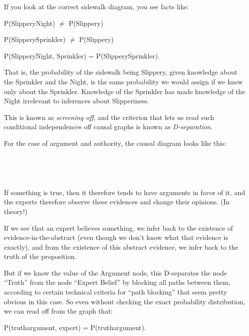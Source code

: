 {
 If you look at the correct sidewalk diagram, you see facts like:}

{\centering
 P(Slippery{\textbar}Night) ${\neq}$ P(Slippery)
\par}


\bigskip

{\centering
 P(Slippery{\textbar}Sprinkler) ${\neq}$ P(Slippery)
\par}


\bigskip

{\centering
 P(Slippery{\textbar}Night, Sprinkler) =
P(Slippery{\textbar}Sprinkler).
\par}


\bigskip

{
 That is, the probability of the sidewalk being Slippery, given
knowledge about the Sprinkler and the Night, is the same probability we
would assign if we knew only about the Sprinkler. Knowledge of the
Sprinkler has made knowledge of the Night irrelevant to inferences
about Slipperiness.}

{
 This is known as \textit{screening off}, and the criterion that
lets us read such conditional independences off causal graphs is known
as \textit{D-separation}.}

{
 For the case of argument and authority, the causal diagram looks
like this:}

{
 ~}



{
 ~}

{
 If something is true, then it therefore tends to have arguments in
favor of it, and the experts therefore observe these evidences and
change their opinions. (In theory!)}

{
 If we see that an expert believes something, we infer back to the
existence of evidence-in-the-abstract (even though we
don't know what that evidence is exactly), and from the
existence of this abstract evidence, we infer back to the truth of the
proposition.}

{
 But if we know the value of the Argument node, this D-separates
the node ``Truth'' from the node
``Expert Belief'' by blocking all
paths between them, according to certain technical criteria for
``path blocking'' that seem pretty
obvious in this case. So even without checking the exact probability
distribution, we can read off from the graph that:}

{\centering
 P(truth{\textbar}argument, expert) = P(truth{\textbar}argument).
\par}


